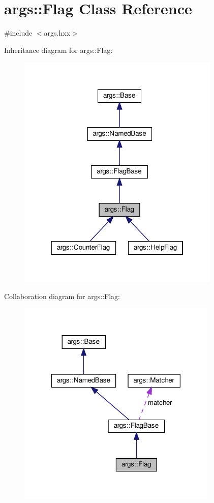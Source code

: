 \hypertarget{classargs_1_1_flag}{}\section{args\+:\+:Flag Class Reference}
\label{classargs_1_1_flag}


{\ttfamily \#include $<$args.\+hxx$>$}



Inheritance diagram for args\+:\+:Flag\+:\nopagebreak
\begin{figure}[H]
\begin{center}
\leavevmode
\includegraphics[width=274pt]{classargs_1_1_flag__inherit__graph}
\end{center}
\end{figure}


Collaboration diagram for args\+:\+:Flag\+:\nopagebreak
\begin{figure}[H]
\begin{center}
\leavevmode
\includegraphics[width=270pt]{classargs_1_1_flag__coll__graph}
\end{center}
\end{figure}
